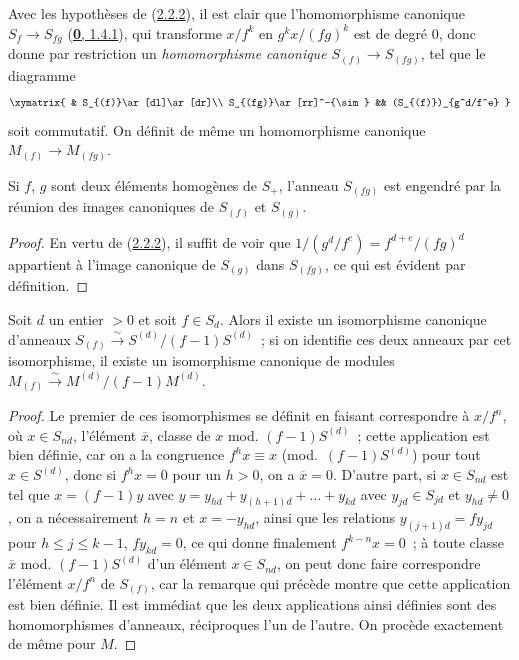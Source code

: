 \begin{env}[2.2.3]
\label{II.2.2.3-fr}
Avec les hypothèses de (\hyperref[II.2.2.2-fr]{2.2.2}), il est clair que
l'homomorphisme canonique $S_f\to S_{fg}$
(\hyperref[0.1.4.1-fr]{\textbf{0}, 1.4.1}), qui transforme $x/f^k$ en
$g^k x/(fg)^k$ est de degré $0$, donc donne par restriction un
\emph{homomorphisme canonique $S_{(f)}\to S_{(fg)}$}, tel que le diagramme
\[
  \xymatrix{
    & S_{(f)}\ar[dl]\ar[dr]\\
    S_{(fg)}\ar[rr]^-{\sim} && (S_{(f)})_{g^d/f^e}
  }
\]
soit commutatif. On définit de même un homomorphisme canonique
$M_{(f)}\to M_{(fg)}$.
\end{env}

\begin{lemma}[2.2.4]
\label{II.2.2.4-fr}
Si $f$, $g$ sont deux éléments homogènes de $S_+$, l'anneau $S_{(fg)}$ est
engendré par la réunion des images canoniques de $S_{(f)}$ et $S_{(g)}$.
\end{lemma}

\begin{proof}
En vertu de (\hyperref[II.2.2.2-fr]{2.2.2}), il suffit de voir que
$1/(g^d/f^e)=f^{d+e}/(fg)^d$ appartient à l'image canonique de $S_{(g)}$
dans $S_{(fg)}$, ce qui est évident par définition.
\end{proof}

\begin{proposition}[2.2.5]
\label{II.2.2.5-fr}
Soit $d$ un entier $>0$ et soit $f\in S_d$. Alors il existe un isomorphisme
canonique d'anneaux
$S_{(f)}\xrightarrow{\sim}S^{(d)}/(f-1)S^{(d)}$~; si on identifie ces deux
anneaux par cet isomorphisme, il existe un isomorphisme canonique de modules
$M_{(f)}\xrightarrow{\sim}M^{(d)}/(f-1)M^{(d)}$.
\end{proposition}

\begin{proof}
Le premier de ces isomorphismes se définit en faisant correspondre à
$x/f^n$, où $x\in S_{nd}$, l'élément $\overline{x}$, classe de $x$ mod.
$(f-1)S^{(d)}$~; cette application est bien définie, car on a la congruence
$f^h x\equiv x$ (mod.~$(f-1)S^{(d)}$) pour tout $x\in S^{(d)}$, donc si
$f^h x=0$ pour un $h>0$,
on a $\overline{x}=0$. D'autre part, si $x\in S_{nd}$ est tel que
$x=(f-1)y$ avec
$y=y_{hd}+y_{(h+1)d}+\ldots+y_{kd}$ avec $y_{jd}\in S_{jd}$ et
$y_{hd}\neq 0$, on a nécessairement $h=n$ et $x=-y_{hd}$, ainsi que les
relations $y_{(j+1)d}=fy_{jd}$ pour $h\leq j\leq k-1$, $fy_{kd}=0$, ce qui
donne finalement $f^{k-n}x=0$~; à toute classe $\overline{x}$ mod.
$(f-1)S^{(d)}$ d'un élément $x\in S_{nd}$, on peut donc faire correspondre
l'élément $x/f^n$ de $S_{(f)}$, car la remarque qui précède montre que cette
application est bien définie. Il est immédiat que les deux applications ainsi
définies sont des homomorphismes d'anneaux, réciproques l'un de l'autre. On
procède exactement de même pour $M$.
\end{proof}

